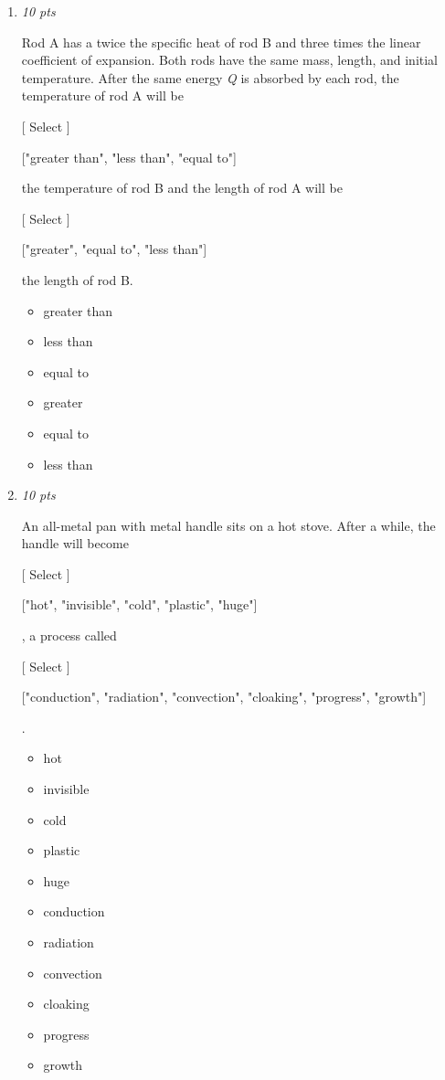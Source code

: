 \documentclass[11pt]{article}
\begin{document}
\begin{enumerate}[leftmargin=*,label=\textbf{Question \arabic*.}]
\item \hfill \textit{10 pts}

Rod A has a twice the specific heat of rod B and three times the linear coefficient of expansion. Both rods have the same mass, length, and initial temperature. After the same energy \emph{Q} is absorbed by each rod, the temperature of rod A will be

    [ Select ]

  ["greater than", "less than", "equal to"]

 the temperature of rod B and the length of rod A will be

    [ Select ]

  ["greater", "equal to", "less than"]

 the length of rod B.

\begin{itemize}
  \item greater than
  \item less than
  \item equal to
  \item greater
  \item equal to
  \item less than
\end{itemize}

\item \hfill \textit{10 pts}

An all-metal pan with metal handle sits on a hot stove. After a while, the handle will become

    [ Select ]

  ["hot", "invisible", "cold", "plastic", "huge"]

, a process called

    [ Select ]

  ["conduction", "radiation", "convection", "cloaking", "progress", "growth"]

.

\begin{itemize}
  \item hot
  \item invisible
  \item cold
  \item plastic
  \item huge
  \item conduction
  \item radiation
  \item convection
  \item cloaking
  \item progress
  \item growth
\end{itemize}

\end{enumerate}
\end{document}
